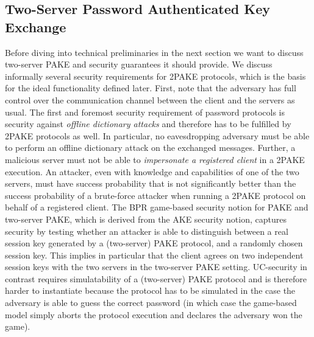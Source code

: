 \subsection{Two-Server Password Authenticated Key Exchange}
Before diving into technical preliminaries in the next section we want to discuss two-server PAKE and security guarantees it should provide.
We discuss informally several security requirements for 2PAKE protocols, which is the basis for the ideal functionality \FTWOPAKE defined later.
First, note that the adversary has full control over the communication channel between the client and the servers as usual.
The first and foremost security requirement of password protocols is security against \emph{offline dictionary attacks} and therefore has to be fulfilled by 2PAKE protocols as well.
In particular, no eavesdropping adversary must be able to perform an offline dictionary attack on the exchanged messages.
Further, a malicious server must not be able to \emph{impersonate a registered client} in a 2PAKE execution.
An attacker, even with knowledge and capabilities of one of the two servers, must have success probability that is not significantly better than the success probability of a brute-force attacker when running a 2PAKE protocol on behalf of a registered client.
The BPR game-based security notion for PAKE and two-server PAKE, which is derived from the AKE security notion, captures security by testing whether an attacker is able to distinguish between a real session key generated by a (two-server) PAKE protocol, and a randomly chosen session key.
This implies in particular that the client agrees on two independent session keys with the two servers in the two-server PAKE setting.
UC-security in contrast requires simulatability of a (two-server) PAKE protocol and is therefore harder to instantiate because the protocol has to be simulated in the case the adversary is able to guess the correct password (in which case the game-based model simply aborts the protocol execution and declares the adversary won the game).


